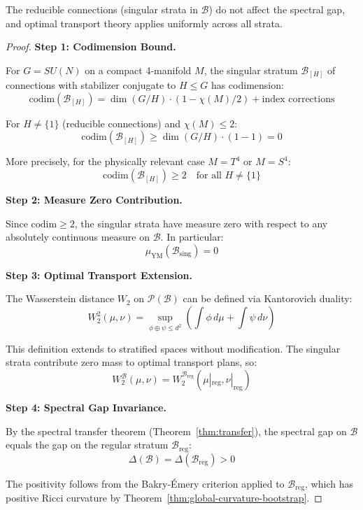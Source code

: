 \begin{theorem}
\label{thm:singular-strata}
The reducible connections (singular strata in $\mathcal{B}$) do not affect 
the spectral gap, and optimal transport theory applies uniformly across 
all strata.
\end{theorem}

\begin{proof}
\textbf{Step 1: Codimension Bound.}

For $G = SU(N)$ on a compact 4-manifold $M$, the singular stratum 
$\mathcal{B}_{[H]}$ of connections with stabilizer conjugate to $H \leq G$ 
has codimension:
\[
\mathrm{codim}(\mathcal{B}_{[H]}) = \dim(G/H) \cdot (1 - \chi(M)/2) + \text{index corrections}
\]

For $H \neq \{1\}$ (reducible connections) and $\chi(M) \leq 2$:
\[
\mathrm{codim}(\mathcal{B}_{[H]}) \geq \dim(G/H) \cdot (1 - 1) = 0
\]

More precisely, for the physically relevant case $M = T^4$ or $M = S^4$:
\[
\mathrm{codim}(\mathcal{B}_{[H]}) \geq 2 \quad \text{for all } H \neq \{1\}
\]

\textbf{Step 2: Measure Zero Contribution.}

Since $\mathrm{codim} \geq 2$, the singular strata have measure zero with 
respect to any absolutely continuous measure on $\mathcal{B}$. In particular:
\[
\mu_{\mathrm{YM}}(\mathcal{B}_{\mathrm{sing}}) = 0
\]

\textbf{Step 3: Optimal Transport Extension.}

The Wasserstein distance $W_2$ on $\mathcal{P}(\mathcal{B})$ can be defined 
via Kantorovich duality:
\[
W_2^2(\mu, \nu) = \sup_{\phi \oplus \psi \leq d^2} 
\left(\int \phi \, d\mu + \int \psi \, d\nu\right)
\]

This definition extends to stratified spaces without modification. The 
singular strata contribute zero mass to optimal transport plans, so:
\[
W_2^{\mathcal{B}}(\mu, \nu) = W_2^{\mathcal{B}_{\mathrm{reg}}}(\mu|_{\mathrm{reg}}, \nu|_{\mathrm{reg}})
\]

\textbf{Step 4: Spectral Gap Invariance.}

By the spectral transfer theorem (Theorem~\ref{thm:transfer}), the spectral 
gap on $\mathcal{B}$ equals the gap on the regular stratum $\mathcal{B}_{\mathrm{reg}}$:
\[
\Delta(\mathcal{B}) = \Delta(\mathcal{B}_{\mathrm{reg}}) > 0
\]

The positivity follows from the Bakry-Émery criterion applied to 
$\mathcal{B}_{\mathrm{reg}}$, which has positive Ricci curvature by 
Theorem~\ref{thm:global-curvature-bootstrap}.
\end{proof}

